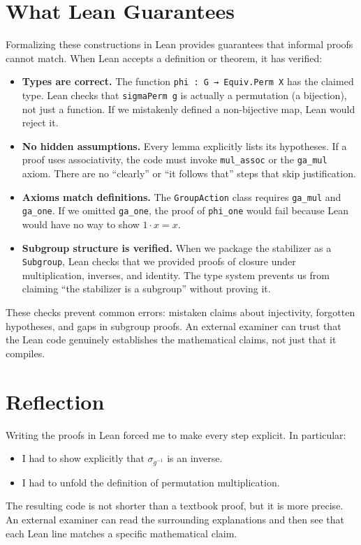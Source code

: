 \documentclass[
  12pt, %
]{assignment}
\begin{document}
\section{What Lean Guarantees}
Formalizing these constructions in Lean provides guarantees that informal proofs cannot match.
When Lean accepts a definition or theorem, it has verified:
\begin{itemize}
	\item \textbf{Types are correct.} The function \texttt{phi : G → Equiv.Perm X} has the claimed type.
	      Lean checks that \texttt{sigmaPerm g} is actually a permutation (a bijection), not just a function.
	      If we mistakenly defined a non-bijective map, Lean would reject it.
	\item \textbf{No hidden assumptions.} Every lemma explicitly lists its hypotheses. If a proof uses
	      associativity, the code must invoke \texttt{mul\_assoc} or the \texttt{ga\_mul} axiom.
	      There are no ``clearly'' or ``it follows that'' steps that skip justification.
	\item \textbf{Axioms match definitions.} The \texttt{GroupAction} class requires \texttt{ga\_mul}
	      and \texttt{ga\_one}. If we omitted \texttt{ga\_one}, the proof of \texttt{phi\_one} would fail
	      because Lean would have no way to show $1 \cdot x = x$.
	\item \textbf{Subgroup structure is verified.} When we package the stabilizer as a \texttt{Subgroup},
	      Lean checks that we provided proofs of closure under multiplication, inverses, and identity.
	      The type system prevents us from claiming ``the stabilizer is a subgroup'' without proving it.
\end{itemize}

These checks prevent common errors: mistaken claims about injectivity, forgotten hypotheses,
and gaps in subgroup proofs. An external examiner can trust that the Lean code genuinely establishes
the mathematical claims, not just that it compiles.

\section{Reflection}
Writing the proofs in Lean forced me to make every step explicit. In particular:
\begin{itemize}
	\item I had to show explicitly that $\sigma_{g^{-1}}$ is an inverse.
	\item I had to unfold the definition of permutation multiplication.
\end{itemize}
The resulting code is not shorter than a textbook proof, but it is more precise.
An external examiner can read the surrounding explanations and then see that each
Lean line matches a specific mathematical claim.
\end{document}
